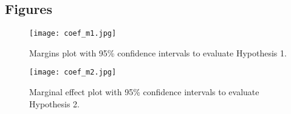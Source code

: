 \documentclass[12pt]{article}
\begin{document}
\clearpage 

\begin{centering}

\end{centering}

\clearpage

\begin{center}
\section*{Figures}
\end{center}

\begin{figure}[h!]
\begin{centering}
\texttt{[image: coef\_m1.jpg]}
\caption{\small Margins plot with 95\% confidence intervals to evaluate Hypothesis 1. }
\label{M1_fig}
\end{centering}
\end{figure}

\clearpage

\begin{figure}[h!]
\begin{centering}
\texttt{[image: coef\_m2.jpg]}
\caption{\small Marginal effect plot with 95\% confidence intervals to evaluate Hypothesis 2.}
\label{figure 2}
\end{centering}
\end{figure}
\end{document}
